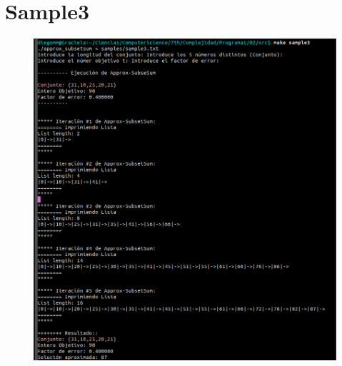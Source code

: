 \documentclass[14pt,letterpaper]{article}
\begin{document}
  \section{\sc Sample3}
  
  \begin{figure}[h]
    \includegraphics[width=15cm]{sample3.png}
    \centering
  \end{figure}
  \clearpage
\end{document}
